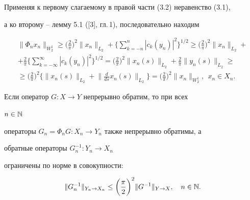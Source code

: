 Применяя к первому слагаемому в правой части (3.2) неравенство (3.1),


а ко второму -- лемму 5.1 ([3], гл.\,1), последовательно находим


\begin{multline*}


\|\Phi_{n}x_{n}\|_{W_{2}^{1}} \ge \bigg(\frac{2}{\pi} \bigg)^2


\|x_{n}\|_{L_2}+\bigg\{ \sum_{k=-n}^{n}


|c_k (y_{n})|^2 \bigg\}^{1/2}


\ge \bigg(\frac{2}{\pi} \bigg)^2 \|x_n\|_{L_2}+ \\


%


+\frac{2}{\pi}


\bigg\{ \sum_{k=-\infty}^{\infty}


|c_{k}(y_n)|^2 \bigg\}^{1/2}=


\bigg( \frac{2}{\pi} \bigg)^2 \|x_n (s)\|_{L_2}+


\frac{2}{\pi}\|y_n(s)\|_{L_2} \ge \\


%


\ge \bigg(\frac{2}{\pi}\bigg)^2 \bigg\{\|x_n(s)\|_{L_2}+


\bigg\|\frac{d}{ds}x_{n}(s)\bigg\|_{L_2} \bigg\}=


\bigg(\frac{2}{\pi} \bigg)^2 \|x_n\|_{W_{2}^{1}},


\ \ x_n \in X_n.


\end{multline*}





\begin{lem}


Если оператор $G:X \to Y$ непрерывно обратим, то при всех


$n\in \Bbb N$


операторы $G_n=\Phi_n G: X_n \to Y_n $ также непрерывно обратимы, а


обратные операторы $G_{n}^{-1} :Y_n \to X_n$


ограничены по норме в совокупности$:$


\begin{equation}


\|G_{n}^{-1}\|_{Y_n \to X_n} \le \bigg(\frac{\pi}{2}\bigg)^2 


\|G^{-1}\|_{Y \to X}, \quad n \in \N.


\end{equation}


\end{lem}





